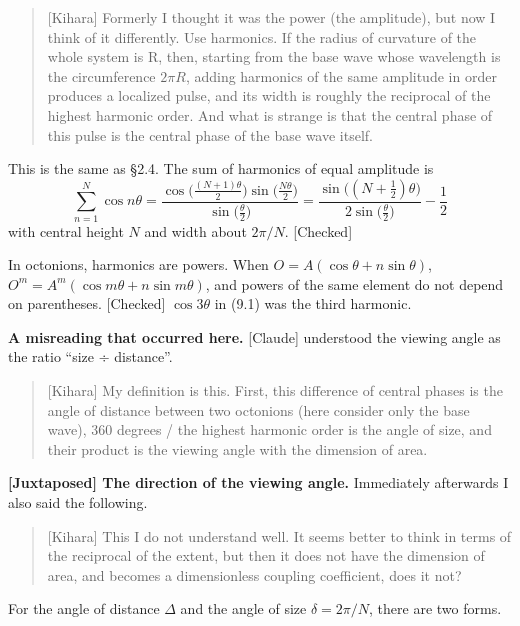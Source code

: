 \documentclass[
  a4paper,
]{article}
\begin{document}
\begin{quote}
{[}Kihara{]} Formerly I thought it was the power (the amplitude), but
now I think of it differently. Use harmonics. If the radius of curvature
of the whole system is R, then, starting from the base wave whose
wavelength is the circumference \(2\pi R\), adding harmonics of the same
amplitude in order produces a localized pulse, and its width is roughly
the reciprocal of the highest harmonic order. And what is strange is
that the central phase of this pulse is the central phase of the base
wave itself.
\end{quote}

This is the same as §2.4. The sum of harmonics of equal amplitude is \[
\sum_{n=1}^{N}\cos n\theta = \frac{\cos\!\big(\tfrac{(N+1)\theta}{2}\big)\sin\!\big(\tfrac{N\theta}{2}\big)}{\sin\!\big(\tfrac{\theta}{2}\big)} = \frac{\sin\!\big((N+\tfrac12)\theta\big)}{2\sin\!\big(\tfrac{\theta}{2}\big)} - \frac12 \tag{12.1}
\] with central height \(N\) and width about \(2\pi/N\). {[}Checked{]}

In octonions, harmonics are powers. When
\(O = A(\cos\theta + n\sin\theta)\),
\(O^m = A^m(\cos m\theta + n\sin m\theta)\), and powers of the same
element do not depend on parentheses. {[}Checked{]} \(\cos3\theta\) in
(9.1) was the third harmonic.

\textbf{A misreading that occurred here.} {[}Claude{]} understood the
viewing angle as the ratio ``size ÷ distance''.

\begin{quote}
{[}Kihara{]} My definition is this. First, this difference of central
phases is the angle of distance between two octonions (here consider
only the base wave), 360 degrees / the highest harmonic order is the
angle of size, and their product is the viewing angle with the dimension
of area.
\end{quote}

\textbf{{[}Juxtaposed{]} The direction of the viewing angle.}
Immediately afterwards I also said the following.

\begin{quote}
{[}Kihara{]} This I do not understand well. It seems better to think in
terms of the reciprocal of the extent, but then it does not have the
dimension of area, and becomes a dimensionless coupling coefficient,
does it not?
\end{quote}

For the angle of distance \(\Delta\) and the angle of size
\(\delta = 2\pi/N\), there are two forms.
\end{document}
